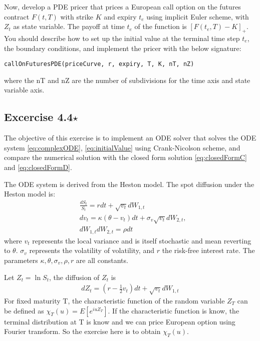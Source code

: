 \documentclass[10pt,a4paper,hidelinks,fleqn]{article}            %
\begin{document}
Now, develop a PDE pricer that prices a European call option on the futures contract $F(t, T)$ with strike $K$ and expiry $t_e$ using implicit Euler scheme, with $Z_t$ as state variable.
The payoff at time $t_e$ of the function is $[F(t_e, T) - K]_+$.
You should describe how to set up the initial value at the terminal time step $t_e$, the boundary conditions, and implement the pricer with the below signature:
\begin{verbatim}
callOnFuturesPDE(priceCurve, r, expiry, T, K, nT, nZ)
\end{verbatim}
where the nT and nZ are the number of subdivisions for the time axis and state variable axis.

\subsection*{Excercise 4.4$\star$}
The objective of this exercise is to implement an ODE solver that solves the ODE system \eqref{eq:complexODE}, \eqref{eq:initialValue} using Crank-Nicolson scheme,
and compare the numerical solution with the closed form solution \eqref{eq:closedFormC} and \eqref{eq:closedFormD}.

The ODE system is derived from the Heston model.  
The spot diffusion under the Heston model is:
\begin{align}
& \frac{dS_t}{S_t} = r dt + \sqrt{v_t} dW_{1, t} \\
& dv_t = \kappa (\theta - v_t) dt + \sigma_v \sqrt{v_t} dW_{2, t}, \\
& dW_{1, t} dW_{2,t} = \rho dt
\end{align}
where $v_t$ represents the local variance and is itself stochastic and mean reverting to $\theta$.
$\sigma_v$ represents the volatility of volatility, and $r$ the risk-free interest rate. The parameters $\kappa, \theta, \sigma_v, \rho, r$ are all constants.

Let $Z_t = \ln S_t$, the diffusion of $Z_t$ is
\begin{align*}
d Z_t = (r - \frac{1}{2} v_t) dt + \sqrt{v_t} dW_{1, t}
\end{align*}
For fixed maturity T, the characteristic function of the random variable $Z_T$ can be defined as $\chi_T(u) = E[e^{iuZ_T}]$.
If the characteristic function is know, the terminal distribution at T is know and we can price European option using Fourier transform.
So the exercise here is to obtain $\chi_T(u)$.
\end{document}
